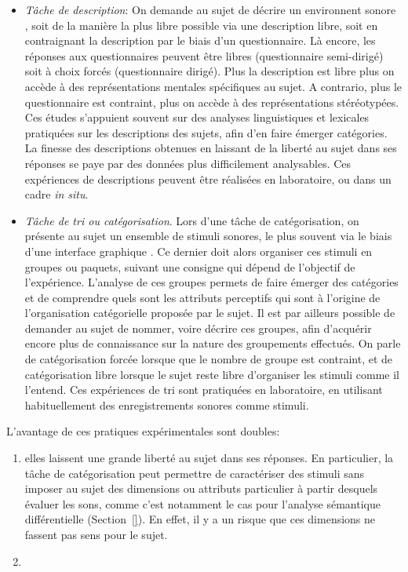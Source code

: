 \begin{itemize}
\item \emph{Tâche de description}: On demande au sujet de décrire un environnent sonore \citep{axelsson2005soundscape,raimbault2005urban,guastavino2006ideal,raimbault2006qualitative}, soit de la manière la plus libre possible via une description libre, soit en contraignant la description par le biais d'un questionnaire. Là encore, les réponses aux questionnaires peuvent être libres (questionnaire semi-dirigé) soit à choix forcés (questionnaire dirigé). Plus la description est libre plus on accède à des représentations mentales spécifiques au sujet. A contrario, plus le questionnaire est contraint, plus on accède à des représentations stéréotypées. Ces études s'appuient souvent sur des analyses linguistiques et lexicales pratiquées sur les descriptions des sujets, afin d'en faire émerger catégories. La finesse des descriptions obtenues en laissant de la liberté au sujet dans ses réponses se paye par des données plus difficilement analysables. Ces expériences de descriptions peuvent être réalisées en laboratoire, ou dans un cadre \emph{in situ}.
\item \emph{Tâche de tri ou catégorisation}. Lors d'une tâche de catégorisation, on présente au sujet un ensemble de stimuli sonores, le plus souvent via le biais d'une interface graphique \citep{maffiolo_caracterisation_1999,guastavino2007categorization}. Ce dernier doit alors organiser ces stimuli en groupes ou paquets, suivant une consigne qui dépend de l'objectif de l’expérience. L'analyse de ces groupes permets de faire émerger des catégories et de comprendre quels sont les attributs perceptifs qui sont à l'origine de l'organisation catégorielle proposée par le sujet. Il est par ailleurs possible de demander au sujet de nommer, voire décrire ces groupes, afin d'acquérir encore plus de connaissance sur la nature des groupements effectués. On parle de catégorisation forcée lorsque que le nombre de groupe est contraint, et de catégorisation libre lorsque le sujet reste libre d'organiser les stimuli comme il l'entend. Ces expériences de tri sont pratiquées en laboratoire, en utilisant habituellement des enregistrements sonores comme stimuli.
\end{itemize}

L'avantage de ces pratiques expérimentales sont doubles:

\begin{enumerate}
\item  elles laissent une grande liberté au sujet dans ses réponses. En particulier, la tâche de catégorisation peut permettre de caractériser des stimuli sans imposer au sujet des dimensions ou attributs particulier à partir desquels évaluer les sons, comme c'est notamment le cas pour l'analyse sémantique différentielle (\Cf Section~\ref{}). En effet, il y a un risque que ces dimensions ne fassent pas sens pour le sujet. 
\item {}
\end{enumerate}

